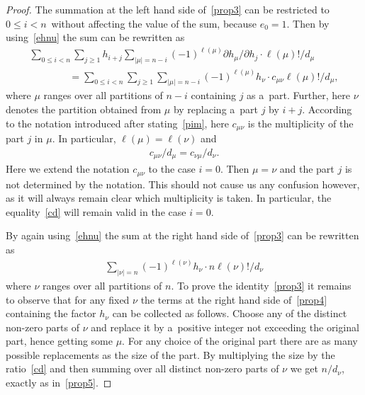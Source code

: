 \begin{proof}
The summation at the left hand side of~\eqref{prop3} can be restricted to $0\le i<n$~without af\/fecting
the value of the sum, because $e_0=1$.
Then by using~\eqref{ehnu} the sum can be rewritten as
\begin{gather}
\sum_{0\le i<n}\sum_{j\ge1}h_{i+j}\sum_{|\mu|=n-i}(-1)^{\ell(\mu)}
\partial h_\mu/\partial h_j\cdot\ell(\mu)
!/d_\mu
\nonumber
\\
\qquad\qquad
=\sum_{0\le i<n}\sum_{j\ge1}\sum_{|\mu|=n-i}(-1)^{\ell(\mu)}h_\nu\cdot c_{\mu\nu}\ell(\mu)!/d_\mu,
\label{prop4}
\end{gather}
where $\mu$ ranges over all partitions of $n-i$ containing $j$ as a~part.
Further, here $\nu$ denotes the partition obtained from $\mu$ by replacing a~part $j$ by $i+j$.
According to the notation introduced after stating~\eqref{pim}, here $c_{\mu\nu}$ is the
multiplicity of the part $j$ in $\mu$.
In particular, $\ell(\mu)=\ell(\nu)$ and
\begin{gather}
\label{cd}
c_{\mu\nu}/d_\mu=c_{\nu\mu}
/d_\nu.
\end{gather}
Here  we extend the notation $c_{\mu\nu}$ to the case $i=0$.
Then $\mu=\nu$ and the part $j$ is not determined by the notation.
This should not cause us any confusion however, as it will always remain clear which multiplicity is taken.
In particular, the equality~\eqref{cd} will remain valid in the case $i=0$.

By again using~\eqref{ehnu} the sum at the right hand side of~\eqref{prop3} can be rewritten as
\begin{gather}
\label{prop5}
\sum_{|\nu|=n}(-1)^{\ell(\nu)}h_\nu\cdot n\ell(\nu)!/d_\nu
\end{gather}
where  $\nu$ ranges over all partitions of $n$.
To prove the identity~\eqref{prop3} it remains to observe that for any f\/ixed $\nu$ the terms at the right
hand side of~\eqref{prop4} containing the factor $h_\nu$ can be collected as follows.
Choose any of the distinct non-zero parts of $\nu$ and replace it by a~positive integer not exceeding the
original part, hence getting some $\mu$.
For any choice of the original part there are as many possible replacements as the size of the part.
By multiplying the size by the ratio~\eqref{cd} and then summing over all distinct non-zero parts of $\nu$
we get $n/d_\nu$, exactly as in~\eqref{prop5}.
\end{proof}


